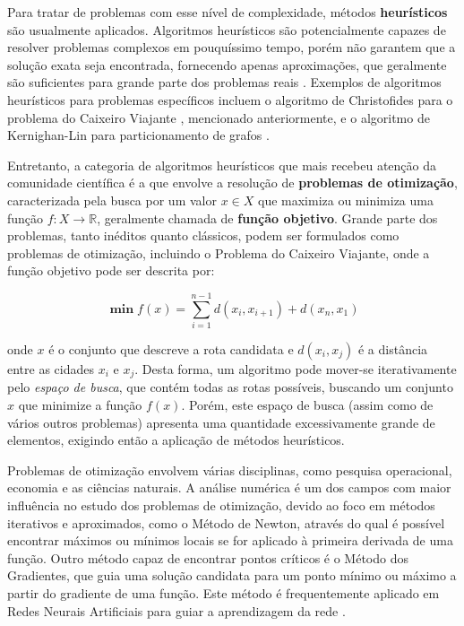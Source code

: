 \documentclass[12pt]{article}
\begin{document}
Para tratar de problemas com esse nível de complexidade, métodos \textbf{heurísticos} são usualmente aplicados. Algoritmos heurísticos são potencialmente capazes de resolver problemas complexos em pouquíssimo tempo, porém não garantem que a solução exata seja encontrada, fornecendo apenas aproximações, que geralmente são suficientes para grande parte dos problemas reais \cite{Kokash2005}. Exemplos de algoritmos heurísticos para problemas específicos incluem o algoritmo de Christofides para o problema do Caixeiro Viajante \cite{Christofides1976}, mencionado anteriormente, e o algoritmo de Kernighan-Lin para particionamento de grafos \cite{Kernighan1970}.

Entretanto, a categoria de algoritmos heurísticos que mais recebeu atenção da comunidade científica é a que envolve a resolução de \textbf{problemas de otimização}, caracterizada pela busca por um valor $x \in X$ que maximiza ou minimiza uma função $f: X \rightarrow \mathbb{R}$, geralmente chamada de \textbf{função objetivo}. Grande parte dos problemas, tanto inéditos quanto clássicos, podem ser formulados como problemas de otimização, incluindo o Problema do Caixeiro Viajante, onde a função objetivo pode ser descrita por:

\begin{equation} \label{eq:tsp}
    \mathop{\boldsymbol\min} f(x) = \sum_{i = 1}^{n - 1} d(x_{i}, x_{i + 1}) + d(x_{n}, x_{1})
\end{equation}

\noindent onde $x$ é o conjunto que descreve a rota candidata e $d(x_{i}, x_{j})$ é a distância entre as cidades $x_{i}$ e $x_{j}$. Desta forma, um algoritmo pode mover-se iterativamente pelo \textit{espaço de busca}, que contém todas as rotas possíveis, buscando um conjunto $x$ que minimize a função $f(x)$. Porém, este espaço de busca (assim como de vários outros problemas) apresenta uma quantidade excessivamente grande de elementos, exigindo então a aplicação de métodos heurísticos.

Problemas de otimização envolvem várias disciplinas, como pesquisa operacional, economia e as ciências naturais. A análise numérica é um dos campos com maior influência no estudo dos problemas de otimização, devido ao foco em métodos iterativos e aproximados, como o Método de Newton, através do qual é possível encontrar máximos ou mínimos locais se for aplicado à primeira derivada de uma função. Outro método capaz de encontrar pontos críticos é o Método dos Gradientes, que guia uma solução candidata para um ponto mínimo ou máximo a partir do gradiente de uma função. Este método é frequentemente aplicado em Redes Neurais Artificiais para guiar a aprendizagem da rede \cite{Haykin1998}.
\end{document}
